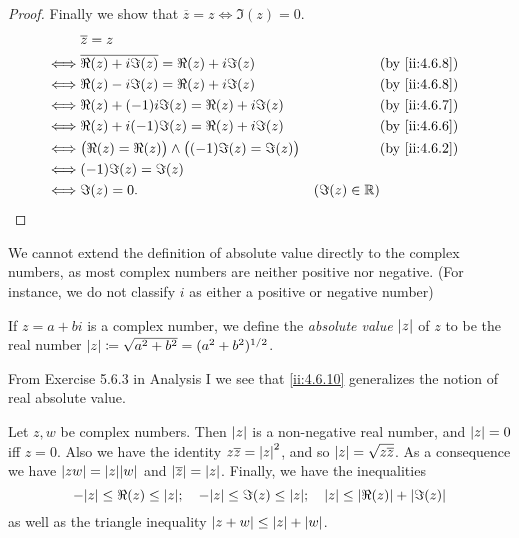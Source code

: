 \begin{proof}
  Finally we show that \(\overline{z} = z \iff \Im(z) = 0\).
  \begin{align*}
         & \overline{z} = z                                                                                 \\
    \iff & \overline{\Re(z) + i \Im(z)} = \Re(z) + i \Im(z)               &                 & \by{ii:4.6.8} \\
    \iff & \Re(z) - i \Im(z) = \Re(z) + i \Im(z)                          &                 & \by{ii:4.6.8} \\
    \iff & \Re(z) + (-1) i \Im(z) = \Re(z) + i \Im(z)                     &                 & \by{ii:4.6.7} \\
    \iff & \Re(z) + i (-1) \Im(z) = \Re(z) + i \Im(z)                     &                 & \by{ii:4.6.6} \\
    \iff & \big(\Re(z) = \Re(z)\big) \land \big((-1) \Im(z) = \Im(z)\big) &                 & \by{ii:4.6.2} \\
    \iff & (-1) \Im(z) = \Im(z)                                                                             \\
    \iff & \Im(z) = 0.                                                    & (\Im(z) \in \R)
  \end{align*}
\end{proof}

\begin{note}
  We cannot extend the definition of absolute value directly to the complex numbers, as most complex numbers are neither positive nor negative.
  (For instance, we do not classify \(i\) as either a positive or negative number)
\end{note}

\begin{defn}\label{ii:4.6.10}
  If \(z = a + bi\) is a complex number, we define the \emph{absolute value} \(\left\lvert z\right\rvert\) of \(z\) to be the real number \(\left\lvert z\right\rvert \coloneqq \sqrt{a^2 + b^2} = (a^2 + b^2)^{1 / 2}\).
\end{defn}

\begin{note}
  From Exercise 5.6.3 in Analysis I we see that \cref{ii:4.6.10} generalizes the notion of real absolute value.
\end{note}

\begin{lem}\label{ii:4.6.11}
  Let \(z, w\) be complex numbers.
  Then \(\left\lvert z\right\rvert\) is a non-negative real number, and \(\left\lvert z\right\rvert = 0\) iff \(z = 0\).
  Also we have the identity \(z \overline{z} = \left\lvert z\right\rvert^2\), and so \(\left\lvert z\right\rvert = \sqrt{z \overline{z}}\).
  As a consequence we have \(\abs{zw} = \abs{z} \abs{w}\) and \(\left\lvert\overline{z}\right\rvert = \left\lvert z\right\rvert\).
  Finally, we have the inequalities
  \[
    -\abs{z} \leq \Re(z) \leq \abs{z}; \quad -\abs{z} \leq \Im(z) \leq \abs{z}; \quad \abs{z} \leq \abs{\Re(z)} + \abs{\Im(z)}
  \]
  as well as the triangle inequality \(\left\lvert z + w\right\rvert \leq \left\lvert z\right\rvert + \left\lvert w\right\rvert\).
\end{lem}

